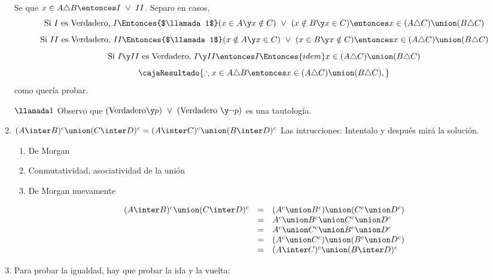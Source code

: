 \begin{enumerate}[label=\roman*)]
        Se que $x \in A \triangle B \entonces I ~\lor~ II$. Separo en casos,
        $$
          \text{Si }I\text{ es Verdadero, }I \Entonces{$\llamada1$} (x \in A \y x \notin C) ~\lor~ (x \notin B \y x \in C) \entonces x \in (A \triangle C) \union (B \triangle C)   \\
        $$
        $$
          \text{Si }II\text{ es Verdadero, }II \Entonces{$\llamada1$} (x \notin A \y x \in C) ~\lor~ (x \in B \y x \notin C) \entonces x \in (A \triangle C) \union (B \triangle C) \\
        $$
        $$
          \text{Si }I \y II\text{ es Verdadero, }I \y II \entonces I
          \Entonces{idem}
          x \in (A \triangle C) \union (B \triangle C)
        $$
        $$
          \cajaResultado{
            \therefore x \in A \triangle B \entonces x \in (A \triangle C) \union (B \triangle C),
          }
        $$
        como quería probar.

        $\llamada1$ Observo que $(\text{Verdadero} \y p) ~\lor~ (\text{Verdadero } \y \neg p)$ es una tautología.

  \item $(A \inter B)^c \union (C \inter D)^c = (A \inter C)^c \union (B \inter D)^c$
        Las intrucciones: Intentalo y después mirá la solución.
        \begin{enumerate}[label=\arabic*)]
          \item De Morgan
          \item Conmutatividad, asociatividad de la unión
          \item De Morgan nuevamente
        \end{enumerate}
        $$
          \begin{array}{rcl}
            (A \inter B)^c \union (C \inter D)^c
             & = &
            (A^c \union B^c) \union (C^c \union D^c) \\
             & = &
            A^c\union B^c \union C^c  \union D^c     \\
             & = &
            A^c \union C^c \union B^c \union D^c     \\
             & = &
            (A^c \union C^c) \union (B^c \union D^c) \\
             & = &
            (A \inter C)^c \union (B \inter D)^c
          \end{array}
        $$

  \item Para probar la igualdad, hay que probar la ida y la vuelta:
\end{enumerate}
